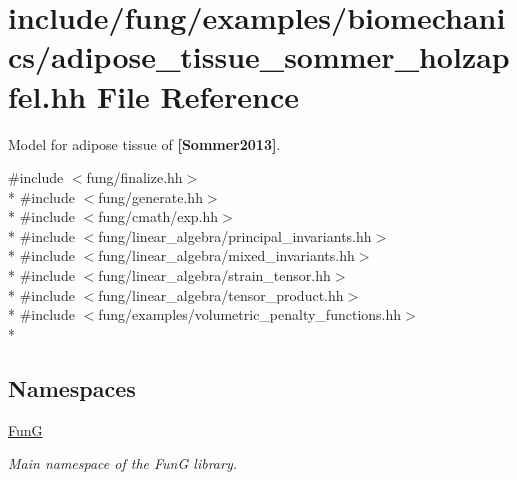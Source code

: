 \hypertarget{adipose__tissue__sommer__holzapfel_8hh}{}\section{include/fung/examples/biomechanics/adipose\+\_\+tissue\+\_\+sommer\+\_\+holzapfel.hh File Reference}
\label{adipose__tissue__sommer__holzapfel_8hh}


Model for adipose tissue of {\bfseries [Sommer2013]}.  


{\ttfamily \#include $<$fung/finalize.\+hh$>$}\\*
{\ttfamily \#include $<$fung/generate.\+hh$>$}\\*
{\ttfamily \#include $<$fung/cmath/exp.\+hh$>$}\\*
{\ttfamily \#include $<$fung/linear\+\_\+algebra/principal\+\_\+invariants.\+hh$>$}\\*
{\ttfamily \#include $<$fung/linear\+\_\+algebra/mixed\+\_\+invariants.\+hh$>$}\\*
{\ttfamily \#include $<$fung/linear\+\_\+algebra/strain\+\_\+tensor.\+hh$>$}\\*
{\ttfamily \#include $<$fung/linear\+\_\+algebra/tensor\+\_\+product.\+hh$>$}\\*
{\ttfamily \#include $<$fung/examples/volumetric\+\_\+penalty\+\_\+functions.\+hh$>$}\\*
\subsection*{Namespaces}
\begin{DoxyCompactItemize}
\item 
 \hyperlink{namespaceFunG}{FunG}
\begin{DoxyCompactList}\small\item\em Main namespace of the FunG library. \end{DoxyCompactList}\end{DoxyCompactItemize}
